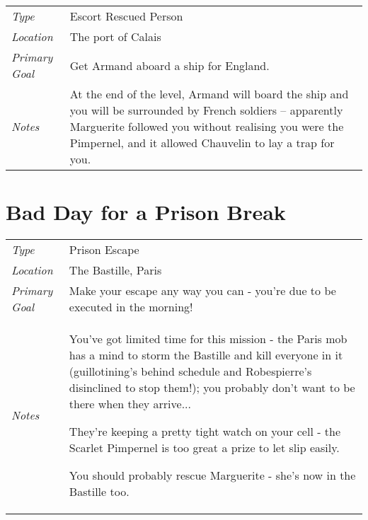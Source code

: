 \begin{tabular}{lp{12cm}}
\emph{Type} & Escort Rescued Person \\
\emph{Location} & The port of Calais \\
\emph{Primary Goal} & Get Armand aboard a ship for England. \\
\emph{Notes} & At the end of the level, Armand will board the ship and you will be surrounded by French soldiers -- apparently Marguerite followed you without realising you were the Pimpernel, and it allowed Chauvelin to lay a trap for you.
\end{tabular}

\section{Bad Day for a Prison Break}

\begin{tabular}{lp{12cm}}
\emph{Type} & Prison Escape \\
\emph{Location} & The Bastille, Paris \\
\emph{Primary Goal} & Make your escape any way you can - you're due to be executed in the morning! \\
\emph{Notes} &
	\vspace{-\baselineskip}
	\begin{list}{}{\leftmargin=1em}
	\item You've got limited time for this mission - the Paris mob has a mind to storm the Bastille and kill everyone in it (guillotining's behind schedule and Robespierre's disinclined to stop them!); you probably don't want to be there when they arrive...
	\item They're keeping a pretty tight watch on your cell - the Scarlet Pimpernel is too great a prize to let slip easily.
	\item You should probably rescue Marguerite - she's now in the Bastille too.
	\end{list}
\end{tabular}
